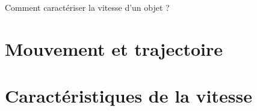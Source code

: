\documentclass[12pt,a4paper]{article}
\date{}
\title{}
\begin{document}
	
\graphicspath{{./img/}}	



\begin{mypb}
	\begin{center}
		{\Large Comment caractériser la vitesse d'un objet ?}
	\end{center}
\end{mypb}


\section{Mouvement et trajectoire}

%






%		

\section{Caractéristiques de la vitesse}

%








\appendix

\end{document}
